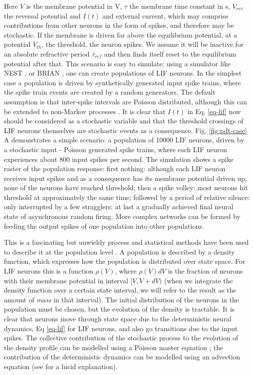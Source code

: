 \documentclass[10pt]{article}
\begin{document}
Here $V$ is the membrane potential in V, $\tau$ the membrane time constant in s, $V_{rev}$ the reversal potential and $I(t)$ and external current, which may comprise contributions from other neurons in the form of spikes, and therefore may be stochastic.
If the membrane is driven far above the equilibrium potential, at a potential $V_{th}$, the threshold, the neuron spikes.
We assume it will be inactive for an absolute refractive period $\tau_{ref}$ and then finds itself reset to the equilibrium potential after that.  
This scenario is easy to simulate: using a simulator like NEST \cite{gewaltig2007nest}, or BRIAN \cite{stimberg2014equation}, one can create populations of LIF neurons.
In the simplest case a population is driven by synthetically generated input spike trains, where the spike train events are created by a random generators.
The default assumption is that inter-spike intervals are Poisson distributed, although this can be extended to non-Markov processes \cite{lai2017population}.
It is clear that $I(t)$ in Eq. \ref{eq-lif} now should be considered as a stochastic variable and that the threshold crossings of LIF neurons themselves are stochastic events as a consequence.
Fig. \ref{fig:pdt-case} A  demonstrates a simple scenario: a population of 10000 LIF neurons, driven by a stochastic input - Poisson generated spike trains, where each LIF neuron experiences about 800 input spikes per second.
The simulation shows a spike raster of the population response:
first nothing: although each LIF neuron receives input spikes and as a consequence has its membrane potential driven up, none of the neurons have reached threshold;
then a spike volley: most neurons hit threshold at approximately the same time;
followed by a period of relative silence: only interrupted by a few stragglers;
at last a gradually achieved final neural state of asynchronous random firing.
More complex networks can be formed by feeding the output spikes of one population into other populations.

This is a fascinating but unwieldy process and statistical methods have been used to describe it at the population level \cite{stein1967some,knight1972dynamics,omurtag2000simulation}.
A population is described by a density function, which expresses how the population is distributed over state space.
For LIF neurons this is a function $\rho(V)$, where $\rho(V)dV$ is the fraction of neurons with their membrane potential in interval $[V, V + dV)$ (when we integrate the density function over a certain state interval, we will refer to the  result as  the amount of \emph{mass} in that interval).
The initial distribution of the neurons in the population must be chosen, but the evolution of the density is tractable.
It is clear that neurons move through state space due to the deterministic neural dynamics, Eq \ref{eq-lif} for LIF neurons, and also go transitions due to the input spikes.
The collective contribution of the stochastic process to the evolution of the density profile can be  modelled using a Poisson master equation \cite{crispin1994handbook}; the contribution of the deterministic dynamics  can be modelled using an advection equation (see \cite{omurtag2000simulation} for a lucid explanation). 
\end{document}
